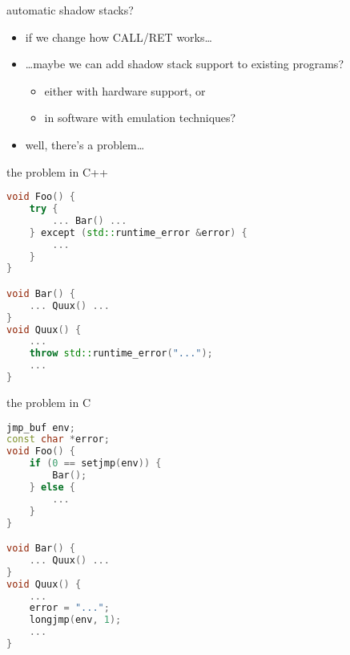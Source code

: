 \usetikzlibrary{arrows.meta,patterns}

\begin{frame}{automatic shadow stacks?}
    \begin{itemize}
    \item if we change how CALL/RET works\ldots
    \item \ldots maybe we can add shadow stack support to existing programs?
    \begin{itemize}
        \item either with hardware support, or
        \item in software with emulation techniques?
        \end{itemize}
    \vspace{.5cm}
    \item well, there's a problem\ldots
    \end{itemize}
\end{frame}


\begin{frame}[fragile,label=noAutomaticStack1]{the problem in C++}
\begin{lstlisting}[language=C++,style=smaller]
void Foo() {
    try {
        ... Bar() ...
    } except (std::runtime_error &error) {
        ...
    }
}

void Bar() {
    ... Quux() ...
}
void Quux() {
    ...
    throw std::runtime_error("...");
    ...
}
\end{lstlisting}    
\end{frame}

\begin{frame}[fragile,label=noAutomaticStack2]{the problem in C}
\begin{lstlisting}[language=C++,style=smaller]
jmp_buf env;
const char *error;
void Foo() {
    if (0 == setjmp(env)) {
        Bar();
    } else {
        ...
    }
}

void Bar() {
    ... Quux() ...
}
void Quux() {
    ...
    error = "...";
    longjmp(env, 1);
    ...
}
\end{lstlisting}    
\end{frame}

